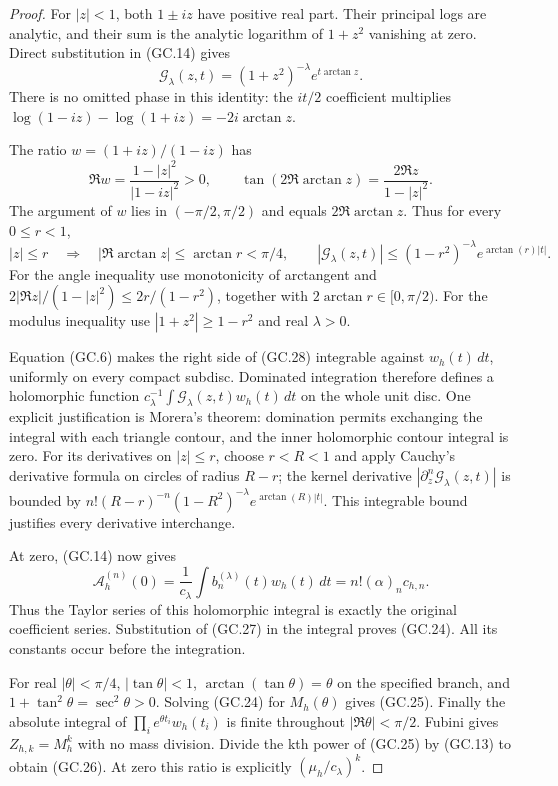 \documentclass[11pt]{article}
\begin{document}
\begin{proof}
For $|z|<1$, both $1\pm iz$ have positive real part. Their principal
logs are analytic, and their sum is the analytic logarithm of
$1+z^2$ vanishing at zero. Direct substitution in (GC.14) gives
\[
 \mathcal G_\lambda(z,t)=(1+z^2)^{-\lambda}
                              e^{t\arctan z}.                 \tag{GC.27}
\]
There is no omitted phase in this identity: the $it/2$ coefficient
multiplies $\log(1-iz)-\log(1+iz)=-2i\arctan z$.

The ratio $w=(1+iz)/(1-iz)$ has
\[
 \Re w=\frac{1-|z|^2}{|1-iz|^2}>0,\qquad
 \tan(2\Re\arctan z)=\frac{2\Re z}{1-|z|^2}.
\]
The argument of $w$ lies in $(-\pi/2,\pi/2)$ and equals
$2\Re\arctan z$. Thus for every $0\le r<1$,
\[
 |z|\le r\quad\Longrightarrow\quad
 |\Re\arctan z|\le\arctan r<\pi/4,
 \qquad
 |\mathcal G_\lambda(z,t)|
 \le(1-r^2)^{-\lambda}e^{\arctan(r)|t|}.                       \tag{GC.28}
\]
For the angle inequality use monotonicity of arctangent and
$2|\Re z|/(1-|z|^2)\le2r/(1-r^2)$, together with
$2\arctan r\in[0,\pi/2)$. For the modulus inequality use
$|1+z^2|\ge1-r^2$ and real $\lambda>0$.

Equation (GC.6) makes the right side of (GC.28) integrable against
$w_h(t)\,dt$, uniformly on every compact subdisc. Dominated
integration therefore defines a holomorphic function
$c_\lambda^{-1}\int\mathcal G_\lambda(z,t)w_h(t)\,dt$ on the
whole unit disc. One explicit justification is Morera's theorem:
domination permits exchanging the integral with each triangle
contour, and the inner holomorphic contour integral is zero.
For its derivatives on $|z|\le r$, choose $r<R<1$ and apply
Cauchy's derivative formula on circles of radius $R-r$; the
kernel derivative $|\partial_z^n\mathcal G_\lambda(z,t)|$ is bounded by
$n!(R-r)^{-n}(1-R^2)^{-\lambda}e^{\arctan(R)|t|}$.
This integrable bound justifies every derivative interchange.

At zero, (GC.14) now gives
\[
 \mathcal A_h^{(n)}(0)=\frac1{c_\lambda}
               \int b_n^{(\lambda)}(t)w_h(t)\,dt
           =n!(\alpha)_nc_{h,n}.                              \tag{GC.29}
\]
Thus the Taylor series of this holomorphic integral is exactly the
original coefficient series. Substitution of (GC.27) in the integral
proves (GC.24). All its constants occur before the integration.

For real $|\theta|<\pi/4$, $|\tan\theta|<1$,
$\arctan(\tan\theta)=\theta$ on the specified branch, and
$1+\tan^2\theta=\sec^2\theta>0$. Solving (GC.24) for
$M_h(\theta)$ gives (GC.25). Finally the absolute integral of
$\prod_i e^{\theta t_i}w_h(t_i)$ is finite throughout
$|\Re\theta|<\pi/2$. Fubini gives $Z_{h,k}=M_h^k$ with no
mass division. Divide the kth power of (GC.25) by (GC.13) to
obtain (GC.26). At zero this ratio is explicitly
$(\mu_h/c_\lambda)^k$.
\end{proof}
\end{document}
